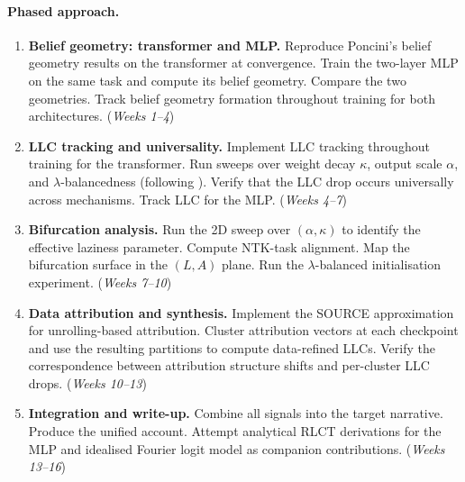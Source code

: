 \documentclass[11pt,a4paper]{article}
\begin{document}
\paragraph{Phased approach.}
\begin{enumerate}[label=Phase \arabic*:]
    \item \textbf{Belief geometry: transformer and MLP.} Reproduce Poncini's belief geometry results on the transformer at convergence. Train the two-layer MLP on the same task and compute its belief geometry. Compare the two geometries. Track belief geometry formation throughout training for both architectures. (\emph{Weeks 1--4})
    \item \textbf{LLC tracking and universality.} Implement LLC tracking throughout training for the transformer. Run sweeps over weight decay $\kappa$, output scale $\alpha$, and $\lambda$-balancedness (following \citet{domine2025lazy}). Verify that the LLC drop occurs universally across mechanisms. Track LLC for the MLP. (\emph{Weeks 4--7})
    \item \textbf{Bifurcation analysis.} Run the 2D sweep over $(\alpha, \kappa)$ to identify the effective laziness parameter. Compute NTK-task alignment. Map the bifurcation surface in the $(L, A)$ plane. Run the $\lambda$-balanced initialisation experiment. (\emph{Weeks 7--10})
    \item \textbf{Data attribution and synthesis.} Implement the SOURCE approximation for unrolling-based attribution. Cluster attribution vectors at each checkpoint and use the resulting partitions to compute data-refined LLCs. Verify the correspondence between attribution structure shifts and per-cluster LLC drops. (\emph{Weeks 10--13})
    \item \textbf{Integration and write-up.} Combine all signals into the target narrative. Produce the unified account. Attempt analytical RLCT derivations for the MLP and idealised Fourier logit model as companion contributions. (\emph{Weeks 13--16})
\end{enumerate}


\end{document}
